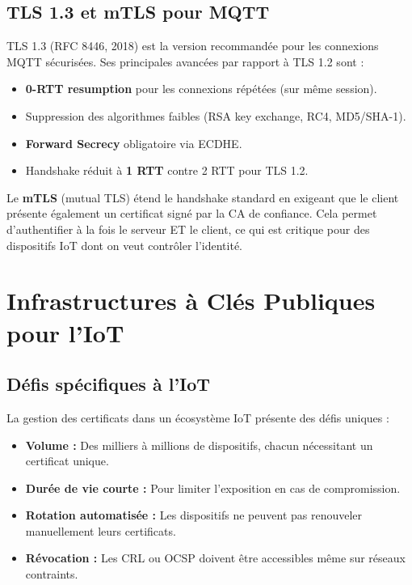 \subsection{TLS 1.3 et mTLS pour MQTT}

TLS 1.3 (RFC 8446, 2018) est la version recommandée pour les connexions MQTT sécurisées. Ses principales avancées par rapport à TLS 1.2 sont :
\begin{itemize}
  \item \textbf{0-RTT resumption} pour les connexions répétées (sur même session).
  \item Suppression des algorithmes faibles (RSA key exchange, RC4, MD5/SHA-1).
  \item \textbf{Forward Secrecy} obligatoire via ECDHE.
  \item Handshake réduit à \textbf{1 RTT} contre 2 RTT pour TLS 1.2.
\end{itemize}

Le \textbf{mTLS} (mutual TLS) étend le handshake standard en exigeant que le client présente également un certificat signé par la CA de confiance. Cela permet d'authentifier à la fois le serveur ET le client, ce qui est critique pour des dispositifs IoT dont on veut contrôler l'identité.

\section{Infrastructures à Clés Publiques pour l'IoT}

\subsection{Défis spécifiques à l'IoT}

La gestion des certificats dans un écosystème IoT présente des défis uniques :
\begin{itemize}
  \item \textbf{Volume :} Des milliers à millions de dispositifs, chacun nécessitant un certificat unique.
  \item \textbf{Durée de vie courte :} Pour limiter l'exposition en cas de compromission.
  \item \textbf{Rotation automatisée :} Les dispositifs ne peuvent pas renouveler manuellement leurs certificats.
  \item \textbf{Révocation :} Les CRL ou OCSP doivent être accessibles même sur réseaux contraints.
\end{itemize}

